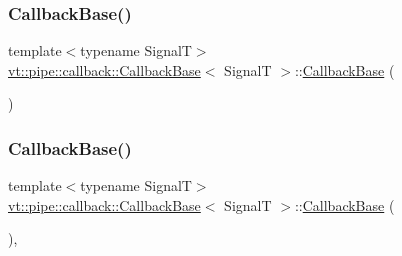 \subsubsection{\texorpdfstring{Callback\+Base()}{CallbackBase()}\hspace{0.1cm}{\footnotesize\ttfamily [3/7]}}
{\footnotesize\ttfamily template$<$typename SignalT$>$ \\
\hyperlink{structvt_1_1pipe_1_1callback_1_1_callback_base}{vt\+::pipe\+::callback\+::\+Callback\+Base}$<$ SignalT $>$\+::\hyperlink{structvt_1_1pipe_1_1callback_1_1_callback_base}{Callback\+Base} (\begin{DoxyParamCaption}{ }\end{DoxyParamCaption})\hspace{0.3cm}{\ttfamily [inline]}}

\mbox{\label{structvt_1_1pipe_1_1callback_1_1_callback_base_ae96d1355aa94b4fd32469bbb9280717c}} 
\subsubsection{\texorpdfstring{Callback\+Base()}{CallbackBase()}\hspace{0.1cm}{\footnotesize\ttfamily [4/7]}}
{\footnotesize\ttfamily template$<$typename SignalT$>$ \\
\hyperlink{structvt_1_1pipe_1_1callback_1_1_callback_base}{vt\+::pipe\+::callback\+::\+Callback\+Base}$<$ SignalT $>$\+::\hyperlink{structvt_1_1pipe_1_1callback_1_1_callback_base}{Callback\+Base} (\begin{DoxyParamCaption}\item[{Callback\+Persist\+Tag\+Type}]{ }\end{DoxyParamCaption})\hspace{0.3cm}{\ttfamily [inline]}, {\ttfamily [explicit]}}

\mbox{\label{structvt_1_1pipe_1_1callback_1_1_callback_base_a18840ed75fb94811cb34c17da8703588}} 
